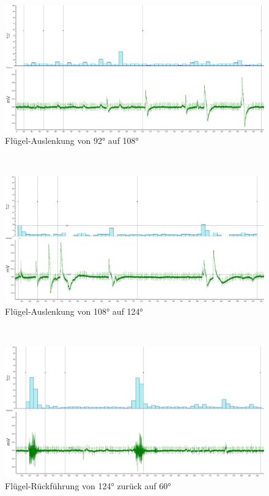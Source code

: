 \documentclass[a4paper]{article}
\begin{document}
\vspace{4.5\baselineskip} \\
\begin{figure}[H]
    \centering
    \includegraphics[scale=0.245]{images/A3_92-108Grad.PNG}
    \caption{\label{fig:A3_3}Flügel-Auslenkung von \ang{92} auf \ang{108}}
\end{figure}

\vspace{2.5\baselineskip} \\
\begin{figure}[H]
    \centering
    \includegraphics[scale=0.25]{images/A3_108-124Grad.PNG}
    \caption{\label{fig:A3_4}Flügel-Auslenkung von \ang{108} auf \ang{124}}
\end{figure}

\vspace{4.5\baselineskip} \\
\begin{figure}[H]
    \centering
    \includegraphics[scale=0.26]{images/A3_124-60Grad.PNG}
    \caption{\label{fig:A3_5}Flügel-Rückführung von \ang{124} zurück auf \ang{60}}
\end{figure}
\end{document}
